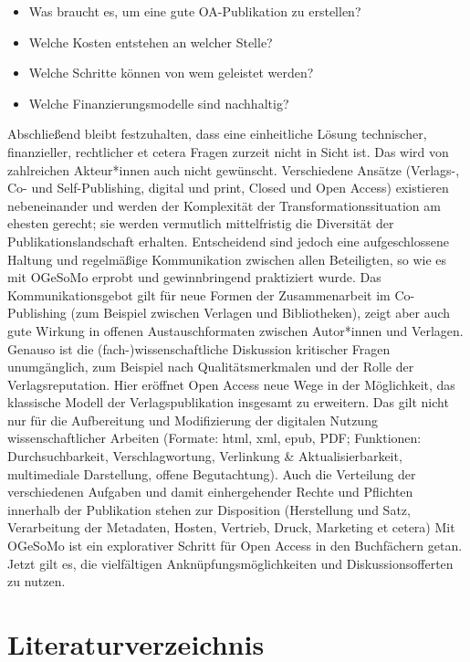 \documentclass[a4paper,
fontsize=11pt,
oneside,
numbers=noperiodatend,
parskip=half-,
bibliography=totoc,
final
]{scrartcl}
\begin{document}
\begin{itemize}

\item
  Was braucht es, um eine gute OA-Publikation zu erstellen?
\item
  Welche Kosten entstehen an welcher Stelle?
\item
  Welche Schritte können von wem geleistet werden?
\item
  Welche Finanzierungsmodelle sind nachhaltig?
\end{itemize}

Abschließend bleibt festzuhalten, dass eine einheitliche Lösung
technischer, finanzieller, rechtlicher et cetera Fragen zurzeit nicht in
Sicht ist. Das wird von zahlreichen Akteur*innen auch nicht gewünscht.
Verschiedene Ansätze (Verlags-, Co- und Self-Publishing, digital und
print, Closed und Open Access) existieren nebeneinander und werden der
Komplexität der Transformationssituation am ehesten gerecht; sie werden
vermutlich mittelfristig die Diversität der Publikationslandschaft
erhalten. Entscheidend sind jedoch eine aufgeschlossene Haltung und
regelmäßige Kommunikation zwischen allen Beteiligten, so wie es mit
OGeSoMo erprobt und gewinnbringend praktiziert wurde. Das
Kommunikationsgebot gilt für neue Formen der Zusammenarbeit im
Co-Publishing (zum Beispiel zwischen Verlagen und Bibliotheken), zeigt
aber auch gute Wirkung in offenen Austauschformaten zwischen Autor*innen
und Verlagen. Genauso ist die (fach-)wissenschaftliche Diskussion
kritischer Fragen unumgänglich, zum Beispiel nach Qualitätsmerkmalen und
der Rolle der Verlagsreputation. Hier eröffnet Open Access neue Wege in
der Möglichkeit, das klassische Modell der Verlagspublikation insgesamt
zu erweitern. Das gilt nicht nur für die Aufbereitung und Modifizierung
der digitalen Nutzung wissenschaftlicher Arbeiten (Formate: html, xml,
epub, PDF; Funktionen: Durchsuchbarkeit, Verschlagwortung, Verlinkung \&
Aktualisierbarkeit, multimediale Darstellung, offene Begutachtung). Auch
die Verteilung der verschiedenen Aufgaben und damit einhergehender
Rechte und Pflichten innerhalb der Publikation stehen zur Disposition
(Herstellung und Satz, Verarbeitung der Metadaten, Hosten, Vertrieb,
Druck, Marketing et cetera) Mit OGeSoMo ist ein explorativer Schritt für
Open Access in den Buchfächern getan. Jetzt gilt es, die vielfältigen
Anknüpfungsmöglichkeiten und Diskussionsofferten zu nutzen.

\pagebreak

\hypertarget{literaturverzeichnis}{%
\section{Literaturverzeichnis}\label{literaturverzeichnis}}
\end{document}
